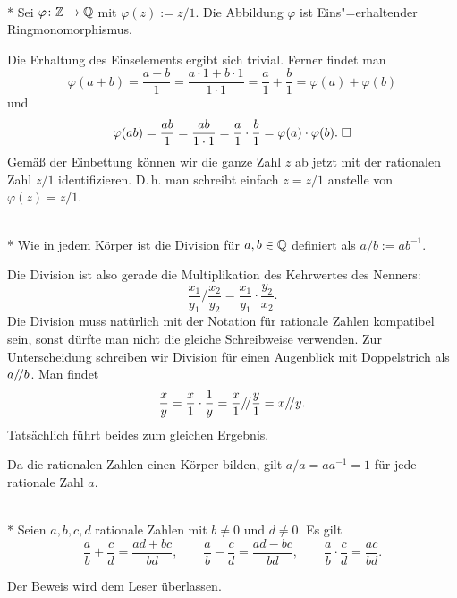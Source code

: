 \newpage
\begin{Satz}\mbox{}\\*
Sei $\varphi\colon\mathbb Z\to\mathbb Q$ mit $\varphi(z):=z/1$. Die
Abbildung $\varphi$ ist Eins"=erhaltender Ringmonomorphismus.
\end{Satz}
 Die Erhaltung des Einselements ergibt sich
trivial. Ferner findet man
\[\varphi(a+b) = \frac{a+b}{1} = \frac{a\cdot 1+b\cdot 1}{1\cdot 1}
= \frac{a}{1}+\frac{b}{1} = \varphi(a)+\varphi(b)\]
und
\[\varphi(ab) = \frac{ab}{1} = \frac{ab}{1\cdot 1} = \frac{a}{1}\cdot\frac{b}{1}
= \varphi(a)\cdot\varphi(b).\;\Box\]
Gemäß der Einbettung können wir die ganze Zahl $z$ ab jetzt
mit der rationalen Zahl $z/1$ identifizieren. D.\,h. man schreibt
einfach $z=z/1$ anstelle von $\varphi(z)=z/1$.

\begin{Definition}\mbox{}\\*
Wie in jedem Körper ist die Division für $a,b\in\mathbb Q$
definiert als $a/b := ab^{-1}$.
\end{Definition}
Die Division ist also gerade die Multiplikation des Kehrwertes
des Nenners:
\[\frac{x_1}{y_1}/\frac{x_2}{y_2} = \frac{x_1}{y_1}\cdot\frac{y_2}{x_2}.\]
Die Division muss natürlich mit der Notation für rationale Zahlen
kompatibel sein, sonst dürfte man nicht die gleiche Schreibweise
verwenden. Zur Unterscheidung schreiben wir Division für einen
Augenblick mit Doppelstrich als $a/\!/ b$. Man findet
\[\frac{x}{y} = \frac{x}{1}\cdot\frac{1}{y}
= \frac{x}{1}/\!/\frac{y}{1} = x/\!/ y.\]
Tatsächlich führt beides zum gleichen Ergebnis.

Da die rationalen Zahlen einen Körper bilden, gilt $a/a=aa^{-1}=1$
für jede rationale Zahl $a$.

\begin{Satz}\mbox{}\\*
Seien $a,b,c,d$ rationale Zahlen mit $b\ne 0$ und $d\ne 0$. Es gilt
\[\frac{a}{b}+\frac{c}{d} = \frac{ad+bc}{bd},
\qquad \frac{a}{b}-\frac{c}{d} = \frac{ad-bc}{bd},
\qquad \frac{a}{b}\cdot\frac{c}{d} = \frac{ac}{bd}.\]
\end{Satz}
Der Beweis wird dem Leser überlassen.

